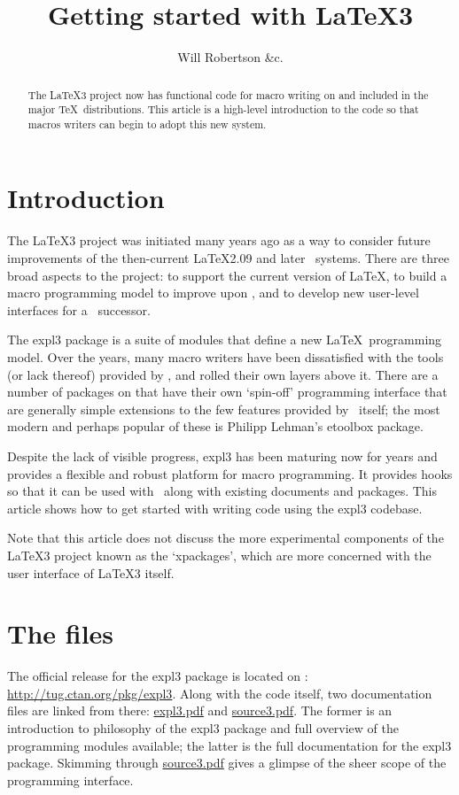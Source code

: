 \documentclass{ltugboat}
\title{Getting started with \LaTeX3}
\author{Will Robertson \&c.}
\def\acro#1{\scalebox{1.1}{\fontsize{8pt}{8pt}\selectfont #1}}
\def\pkg#1{\textsf{#1}}
\begin{document}
\begin{abstract}

The \LaTeX3 project now has functional code for macro writing on \acro{CTAN}
and included in the major \TeX\ distributions. This article is a high-level
introduction to the code so that macros writers can begin to adopt this new
system.

\end{abstract}  

\section{Introduction}
\label{sec:intro}

The \LaTeX3 project was initiated many years ago as a way to consider future
improvements of the then-current \LaTeX2.09 and later \LaTeXe\ systems. There
are three broad aspects to the project: to support the current version of
\LaTeX, to build a macro programming model to improve upon \LaTeXe, and to
develop new user-level interfaces for a \LaTeXe\ successor.

The \pkg{expl3} package is a suite of modules that define a new \LaTeX\
programming model. Over the years, many macro writers have been dissatisfied
with the tools (or lack thereof) provided by \LaTeXe, and rolled their own
layers above it. There are a number of packages on \acro{CTAN} that have their
own `spin-off' programming interface that are generally simple extensions to
the few features provided by \LaTeXe\ itself; the most modern and perhaps
popular of these is Philipp Lehman's \pkg{etoolbox} package.

Despite the lack of visible progress, \pkg{expl3} has been maturing now for
years and provides a flexible and robust platform for macro programming. It
provides hooks so that it can be used with \LaTeXe\ along with existing
documents and packages. This article shows how to get started with writing
code using the \pkg{expl3} codebase.

Note that this article does not discuss the more experimental components of
the \LaTeX3 project known as the `\pkg{xpackages}', which are more concerned
with the user interface of \LaTeX3 itself.

\section{The files}

The official release for the \pkg{expl3} package is located on \acro{CTAN}:
\url{http://tug.ctan.org/pkg/expl3}. Along with the code itself, two
documentation files are linked from there: \url{expl3.pdf} and
\url{source3.pdf}. The former is an introduction to philosophy of the
\pkg{expl3} package and full overview of the programming modules available;
the latter is the full documentation for the \pkg{expl3} package. Skimming
through \url{source3.pdf} gives a glimpse of the sheer scope of the
programming interface.
\end{document}

